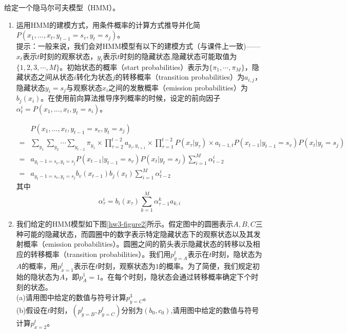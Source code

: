 \begin{problem}
\indent 给定一个隐马尔可夫模型（HMM）。
\begin{enumerate}
    \item 运用HMM的建模方式，用条件概率的计算方式推导并化简$P(x_1,...,x_t,y_{t-1}=s_v,y_t=s_j)$。\\
\indent 提示：一般来说，我们会对HMM模型有以下的建模方式（与课件上一致)——$x_t$表示$t$时刻的观察状态，$y_t$表示$t$时刻的隐藏状态,隐藏状态可能取值为$\{1,2,3,\cdots, M \}$。初始状态的概率（start probabilities）表示为$\{ \pi_1, \cdots, \pi_M\}$，隐藏状态之间从状态$i$转化为状态$j$的转移概率（transition probabilities）为$a_{i,j}$，隐藏状态$y_i=s_j$与观察状态$x_i$之间的发散概率（emission probabilities）为$b_j(x_i)$。在使用前向算法推导序列概率的时候，设定的前向因子$ \alpha_t^i=P(x_1,...,x_t,y_t=s_i)$。
\begin{solution}
    \begin{align*}
        &P(x_1,...,x_t,y_{t-1}=s_v,y_t=s_j) \\
        =& \sum_{y_1}\sum_{y_2}\cdots\sum_{y_{t-2}}\pi_{y_1}\times\prod_{\tau=2}^{t-2}a_{y_\tau,y_{\tau+1}}\times\prod_{\tau=1}^{t-2} P(x_\tau|y_\tau)\times a_{t-1,t} P(x_{t-1}|y_{t-1}=s_v) P(x_t|y_t=s_j)\\
        =& a_{y_t-1=s_v,y_t=s_j} P(x_{t-1}|y_{t-1}=s_v) P(x_t|y_t=s_j) \sum_{i=1}^M\alpha_{t-2}^i\\
        =& a_{y_t-1=s_v,y_t=s_j} b_{v}(x_{t-1})b_{j}(x_t)\sum_{i=1}^M\alpha_{t-2}^i
    \end{align*}
    其中
    \begin{equation*}
        \alpha_\tau^i = b_{i}(x_{\tau})\sum_{k=1}^M \alpha_{\tau-1}^k a_{k,i}
    \end{equation*}
\end{solution}
    \item 我们给定的HMM模型如下图\ref{hw3-figure2}所示。假定图中的圆圈表示$A, B, C$三种可能的隐藏状态，而圆圈中的数字表示特定隐藏状态下的观察状态以及其发射概率（emission probabilities）。圆圈之间的箭头表示隐藏状态的转移以及相应的转移概率（transition probabilities）。我们用$p_{y=A}^t$表示在$t$时刻，隐状态为$A$的概率，用$p_{x=1}^t$表示在$t$时刻，观察状态为$1$的概率。为了简便，我们规定初始的隐状态为$A$，即$p_A^1 = 1$。在每个时刻，隐状态会通过转移概率确定下个时刻的状态。\\
\indent (a)请用图中给定的数值与符号计算$p_{y=C}^3$。\\
\indent (b)假设在$t$时刻，$(p_{y=B}^t, p_{y=C}^t)$分别为$(b_0, c_0)$,请用图中给定的数值与符号计算$p_{x=2}^t$。

\end{enumerate}
\end{problem}
